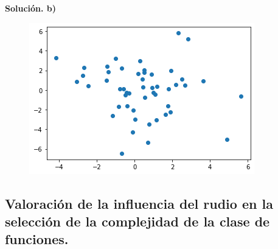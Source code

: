 \documentclass[a4paper,11pt]{article}
\begin{document}
\textbf{Solución. b)}

\begin{figure}[h]
\includegraphics[scale=0.7]{ej1b}
\centering
\end{figure}

\subsection{Valoración de la influencia del rudio en la selección de la complejidad de la clase de funciones.}
\end{document}

